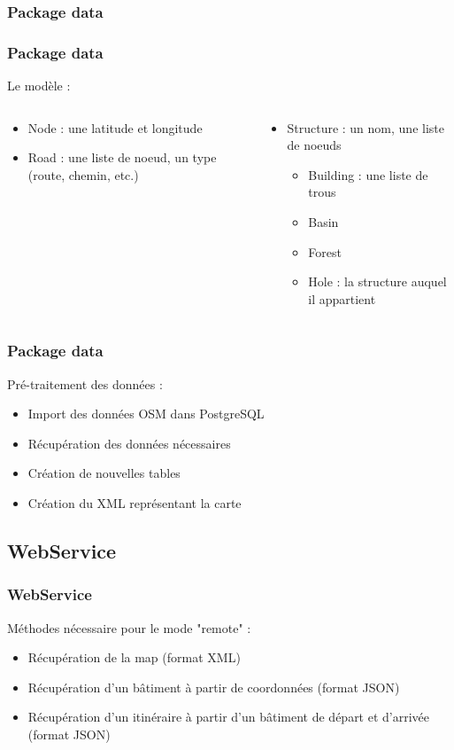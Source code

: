 \documentclass{beamer}
\begin{document}
\subsubsection{Package data}
\begin{frame}
\frametitle{Package data}

Le modèle :\\
\begin{columns}
\begin{column}{.49\textwidth}
\begin{itemize}
\item Node : une latitude et longitude
\item Road : une liste de noeud, un type (route, chemin, etc.)
\end{itemize}
\end{column}
\begin{column}{.49\textwidth}
\begin{itemize}
\item Structure : un nom, une liste de noeuds
\begin{itemize}
\item Building : une liste de trous
\item Basin
\item Forest
\item Hole : la structure auquel il appartient
\end{itemize}
\end{itemize}
\end{column}
\end{columns}
\end{frame}

\begin{frame}
\frametitle{Package data}
Pré-traitement des données :
\begin{itemize}
\item Import des données OSM dans PostgreSQL
\item Récupération des données nécessaires
\item Création de nouvelles tables
\item Création du XML représentant la carte
\end{itemize}
\end{frame}


\subsection{WebService}
\begin{frame}
\frametitle{WebService}
Méthodes nécessaire pour le mode "remote" :
\begin{itemize}
\item Récupération de la map (format XML)
\item Récupération d'un bâtiment à partir de coordonnées (format JSON)
\item Récupération d'un itinéraire à partir d'un bâtiment de départ et d'arrivée (format JSON)
\end{itemize}
\end{frame}
\end{document}
